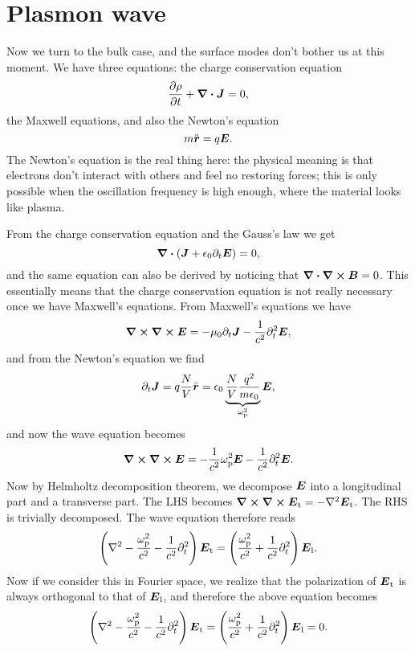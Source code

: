 \documentclass[hyperref, a4paper]{article}
\newcommand*{\omegap}{\omega_{\text{p}}}
\begin{document}
\section{Plasmon wave}

Now we turn to the bulk case, and the surface modes don't bother us at this moment.
We have three equations: 
the charge conservation equation 
\begin{equation}
    \pdv{\rho}{t} + \div{\vb*{J}} = 0,
\end{equation}
the Maxwell equations, and also the Newton's equation
\begin{equation}
    m \ddot{\vb*{r}} = q \vb*{E}.
\end{equation}
The Newton's equation is the real thing here: 
the physical meaning is that electrons don't interact with others 
and feel no restoring forces; 
this is only possible when the oscillation frequency is high enough,
where the material looks like plasma.

From the charge conservation equation and the Gauss's law we get 
\begin{equation}
    \div{(\vb*{J} + \epsilon_0 \partial_t \vb*{E})} = 0,
\end{equation} 
and the same equation can also be derived by noticing that $\div{\curl{\vb*{B}}} = 0$.
This essentially means that the charge conservation equation 
is not really necessary once we have Maxwell's equations.
From Maxwell's equations we have 
\begin{equation}
    \curl{\curl{\vb*{E}}} = - \mu_0 \partial_t \vb*{J} - \frac{1}{c^2} \partial_t^2 \vb*{E},
\end{equation}
and from the Newton's equation we find 
\begin{equation}
    \partial_t \vb*{J} = q \frac{N}{V} \ddot{\vb*{r}}
    = \epsilon_0 \underbrace{\frac{N}{V} \frac{q^2}{m \epsilon_0}}_{\omega_{\text{p}}^2} \vb*{E},
\end{equation}
and now the wave equation becomes 
\begin{equation}
    \curl{\curl{\vb*{E}}} = - \frac{1}{c^2} \omega_{\text{p}}^2 \vb*{E} - \frac{1}{c^2} \partial_t^2 \vb*{E}.
\end{equation}
Now by Helmholtz decomposition theorem, we decompose $\vb*{E}$ into 
a longitudinal part and a transverse part.
The LHS becomes $\curl{\curl{\vb*{E}_{\text{t}}}} = - \laplacian \vb*{E}_{\text{t}}$.
The RHS is trivially decomposed.
The wave equation therefore reads 
\begin{equation}
    \left(\laplacian - \frac{\omegap^2}{c^2} - \frac{1}{c^2} \partial_t^2\right) \vb*{E}_{\text{t}}
    = \left( \frac{\omegap^2}{c^2} + \frac{1}{c^2} \partial_t^2 \right) \vb*{E}_{\text{l}}.
\end{equation}
Now if we consider this in Fourier space, 
we realize that the polarization of $\vb*{E}_{\text{t}}$
is always orthogonal to that of $\vb*{E}_{\text{l}}$, 
and therefore the above equation becomes 
\begin{equation}
    \left(\laplacian - \frac{\omegap^2}{c^2} - \frac{1}{c^2} \partial_t^2\right) \vb*{E}_{\text{t}}
    = \left( \frac{\omegap^2}{c^2} + \frac{1}{c^2} \partial_t^2 \right) \vb*{E}_{\text{l}} = 0.
\end{equation}
\end{document}
